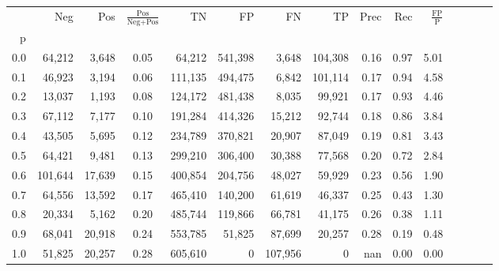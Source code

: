 \begin{tabular}{rrrcrrrrrrrrrrr}
\toprule
{} &      Neg &     Pos & $\frac{\text{Pos}}{\text{Neg}+\text{Pos}}$ &       TN &       FP &       FN &       TP &  Prec &   Rec & $\frac{\text{FP}}{\text{P}}$ \\
p   &          &         &                                            &          &          &          &          &       &       &                              \\
\midrule
0.0 &   64,212 &   3,648 &                                       0.05 &   64,212 &  541,398 &    3,648 &  104,308 &  0.16 &  0.97 &                         5.01 \\
0.1 &   46,923 &   3,194 &                                       0.06 &  111,135 &  494,475 &    6,842 &  101,114 &  0.17 &  0.94 &                         4.58 \\
0.2 &   13,037 &   1,193 &                                       0.08 &  124,172 &  481,438 &    8,035 &   99,921 &  0.17 &  0.93 &                         4.46 \\
0.3 &   67,112 &   7,177 &                                       0.10 &  191,284 &  414,326 &   15,212 &   92,744 &  0.18 &  0.86 &                         3.84 \\
0.4 &   43,505 &   5,695 &                                       0.12 &  234,789 &  370,821 &   20,907 &   87,049 &  0.19 &  0.81 &                         3.43 \\
0.5 &   64,421 &   9,481 &                                       0.13 &  299,210 &  306,400 &   30,388 &   77,568 &  0.20 &  0.72 &                         2.84 \\
0.6 &  101,644 &  17,639 &                                       0.15 &  400,854 &  204,756 &   48,027 &   59,929 &  0.23 &  0.56 &                         1.90 \\
0.7 &   64,556 &  13,592 &                                       0.17 &  465,410 &  140,200 &   61,619 &   46,337 &  0.25 &  0.43 &                         1.30 \\
0.8 &   20,334 &   5,162 &                                       0.20 &  485,744 &  119,866 &   66,781 &   41,175 &  0.26 &  0.38 &                         1.11 \\
0.9 &   68,041 &  20,918 &                                       0.24 &  553,785 &   51,825 &   87,699 &   20,257 &  0.28 &  0.19 &                         0.48 \\
1.0 &   51,825 &  20,257 &                                       0.28 &  605,610 &        0 &  107,956 &        0 &   nan &  0.00 &                         0.00 \\
\bottomrule
\end{tabular}
